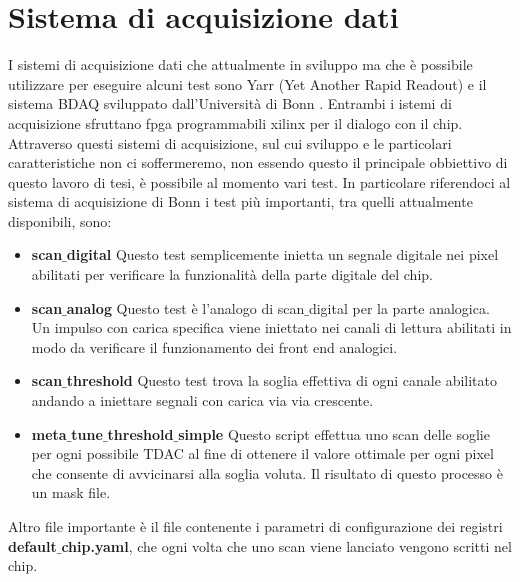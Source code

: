 \section{Sistema di acquisizione dati}
I sistemi di acquisizione dati che attualmente in sviluppo ma che è possibile utilizzare per eseguire alcuni test sono Yarr (Yet Another Rapid Readout) \cite{YARR} e il sistema BDAQ sviluppato dall'Università di Bonn \cite{BDAQ}. 
Entrambi i istemi di acquisizione sfruttano fpga programmabili xilinx per il dialogo con il chip. 
Attraverso questi sistemi di acquisizione, sul cui sviluppo e le particolari caratteristiche non ci soffermeremo, non essendo questo il principale obbiettivo di questo lavoro di tesi, è possibile al momento vari test. 
In particolare riferendoci al sistema di acquisizione di Bonn i test più importanti, tra quelli attualmente disponibili, sono:
\begin{itemize}
\item \textbf{scan$\_$digital} Questo test semplicemente inietta un segnale digitale nei pixel abilitati per verificare la funzionalità della parte digitale del chip.%
\item \textbf{scan$\_$analog}  Questo test è l'analogo di scan$\_$digital per la parte analogica. Un impulso con carica specifica viene iniettato nei canali di lettura abilitati in modo da verificare il funzionamento dei front end analogici. %
\item \textbf{scan$\_$threshold}  Questo test trova la soglia effettiva di ogni canale abilitato andando a iniettare segnali con carica via via crescente.%
\item \textbf{meta$\_$tune$\_$threshold$\_$simple} Questo script effettua uno scan delle soglie per ogni possibile TDAC al fine di ottenere il valore ottimale per ogni pixel che consente di avvicinarsi alla soglia voluta. Il risultato di questo processo è un mask file.%
\end{itemize}
Altro file importante è il file contenente i parametri di configurazione dei registri \textbf{default$\_$chip.yaml}, che ogni volta che uno scan viene lanciato vengono scritti nel chip. 

